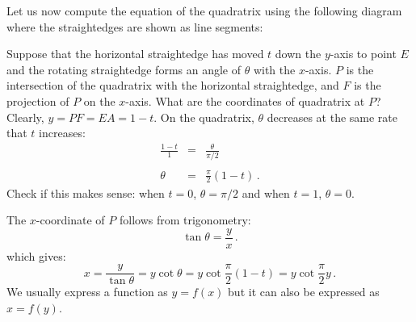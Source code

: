 \documentclass[11pt,a4paper]{article}
\newcommand*{\qd}{quadratrix}
\begin{document}
Let us now compute the equation of the \qd{} using the following diagram where the straightedges are shown as line segments:

\begin{center}
\end{center}

Suppose that the horizontal straightedge has moved $t$ down the $y$-axis to point $E$ and the rotating straightedge forms an angle of $\theta$ with the $x$-axis. $P$ is the intersection of the \qd{} with the horizontal straightedge, and $F$ is the projection of $P$ on the $x$-axis. What are the coordinates of \qd{} at $P$? Clearly, $y=PF=EA=1-t$. On the \qd{}, $\theta$ decreases at the same rate that $t$ increases:
\begin{eqnarray*}
\frac{1-t}{1} &=& \frac{\theta}{\pi/2}\\
&&\\
\theta &=&\frac{\pi}{2}(1-t)\,.
\end{eqnarray*}
Check if this makes sense: when $t=0$, $\theta=\pi/2$ and when $t=1$, $\theta=0$.

The $x$-coordinate of $P$ follows from trigonometry:
\[
\tan \theta = \frac{y}{x}\,.
\]
which gives:
\[
x = \frac{y}{\tan\theta}=y\cot\theta=y\cot \frac{\pi}{2}(1-t)=y\cot \frac{\pi}{2}y\,.
\]
We usually express a function as $y=f(x)$ but it can also be expressed as $x=f(y)$.
\end{document}

